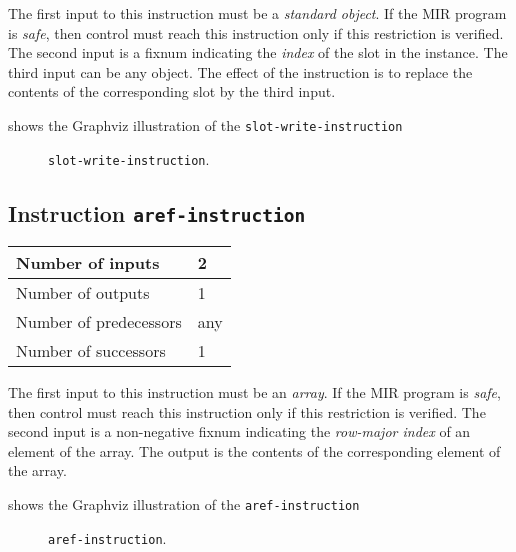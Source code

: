 The first input to this instruction must be a \emph{standard object}.
If the MIR program is \emph{safe}, then control must reach this
instruction only if this restriction is verified.  The second input is
a fixnum indicating the \emph{index} of the slot in the instance.  The
third input can be any object.  The effect of the instruction is to
replace the contents of the corresponding slot by the third input.

 shows the Graphviz illustration of the
\texttt{slot-write-instruction}

\begin{figure}
\begin{center}
\end{center}
\caption{\label{fig-slot-write-instruction}
\texttt{slot-write-instruction}.}
\end{figure}

\subsection{Instruction \texttt{aref-instruction}}
\label{mir-instruction-aref}

\begin{tabular}{|l|l|}
\hline
Number of inputs & 2\\
\hline
Number of outputs & 1\\
\hline
Number of predecessors & any\\
\hline
Number of successors & 1\\
\hline
\end{tabular}

The first input to this instruction must be an \emph{array}.  If the
MIR program is \emph{safe}, then control must reach this instruction
only if this restriction is verified.  The second input is a
non-negative fixnum indicating the \emph{row-major index} of an
element of the array.  The output is the contents of the corresponding
element of the array.

 shows the Graphviz illustration of the
\texttt{aref-instruction}

\begin{figure}
\begin{center}
\end{center}
\caption{\label{fig-aref-instruction}
\texttt{aref-instruction}.}
\end{figure}


